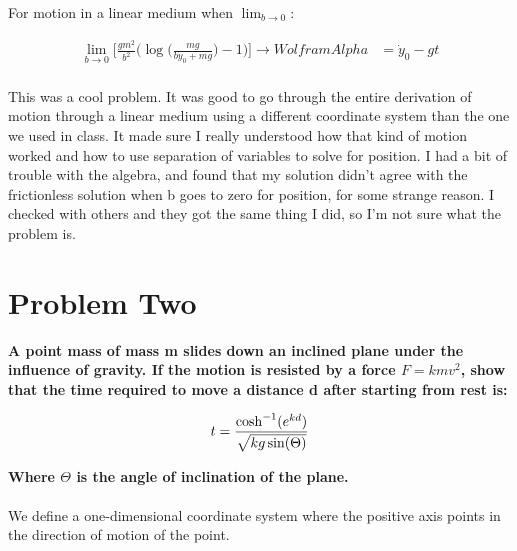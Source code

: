 \documentclass[10pt]{article} %
\begin{document}
For motion in a linear medium when $\lim_{b\rightarrow0}$:

\begin{align*}
  \lim_{b\rightarrow0}\Bigg[\frac{gm^2}{b^2}\Bigg(\log\Big(\frac{mg}{b\dot{y}_0 + mg}\Big) - 1\Bigg)\Bigg] \rightarrow WolframAlpha &= \dot{y}_0 - gt\\
\end{align*}

This was a cool problem. It was good to go through the entire derivation of motion through a linear medium using a different coordinate system than the one we used in class. It made sure I really understood how that kind of motion worked and how to use separation of variables to solve for position. I had a bit of trouble with the algebra, and found that my solution didn't agree with the frictionless solution when b goes to zero for position, for some strange reason. I checked with others and they got the same thing I did, so I'm not sure what the problem is.\\

\vspace{1 cm}

\section{Problem Two}
\textbf{A point mass of mass m slides down an inclined plane under the influence of gravity. If the motion is resisted by a force $F=kmv^2$, show that the time required to move a distance d after starting from rest is:}

\begin{equation*}
  t = \frac{\cosh^{-1}(e^{kd})}{\sqrt{kg\sin(\Theta)}}\\
\end{equation*}

\textbf{Where $\Theta$ is the angle of inclination of the plane.} \\ \\

We define a one-dimensional coordinate system where the positive axis points in the direction of motion of the point.\\
\end{document}
